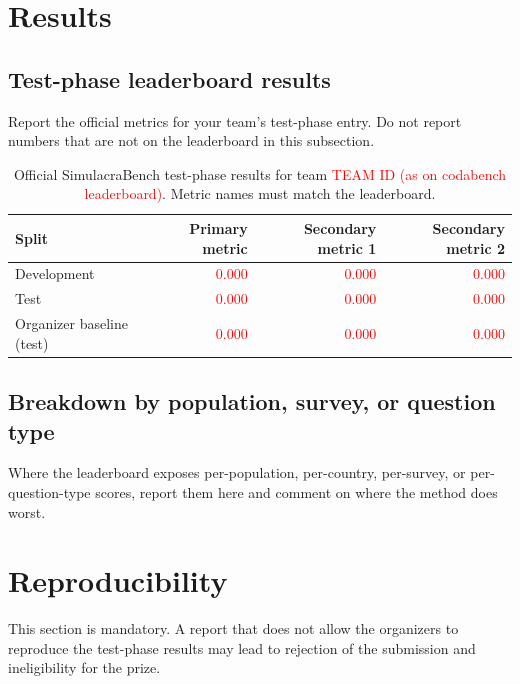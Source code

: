 \documentclass{article}
\newcommand{\teamid}{\textcolor{red}{TEAM ID (as on codabench leaderboard)}}
\begin{document}
\section{Results}
\label{sec:results}

\subsection{Test-phase leaderboard results}
Report the official metrics for your team's test-phase entry. Do not report numbers that are not on the leaderboard in this subsection.

\begin{table}[h]
  \centering
  \caption{Official SimulacraBench test-phase results for team \teamid. Metric names must match the leaderboard.}
  \label{tab:results}
  \begin{tabular}{lrrr}
    \toprule
    Split & Primary metric & Secondary metric 1 & Secondary metric 2 \\
    \midrule
    Development & \textcolor{red}{0.000} & \textcolor{red}{0.000} & \textcolor{red}{0.000} \\
    Test        & \textcolor{red}{0.000} & \textcolor{red}{0.000} & \textcolor{red}{0.000} \\
    Organizer baseline (test) & \textcolor{red}{0.000} & \textcolor{red}{0.000} & \textcolor{red}{0.000} \\
    \bottomrule
  \end{tabular}
\end{table}

\subsection{Breakdown by population, survey, or question type}
Where the leaderboard exposes per-population, per-country, per-survey, or per-question-type scores, report them here and comment on where the method does worst.

\section{Reproducibility}
\label{sec:repro}

This section is mandatory. A report that does not allow the organizers to reproduce the test-phase results may lead to rejection of the submission and ineligibility for the prize.
\end{document}
